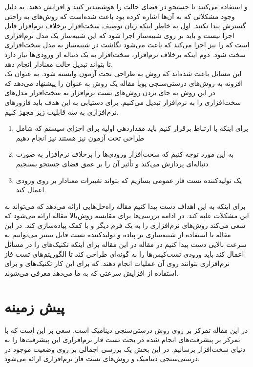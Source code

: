 \documentclass[conference]{IEEEtran}
\begin{document}
و
استفاده می‌کنند تا جستجو‌ در فضای حالت را هوشمند‌تر کنند و افزایش دهند.
به دلیل وجود مشکلاتی که 
به آن‌ها اشاره کرده بود \cite{b3}
باعث شده‌است که روش‌های
به راحتی گسترش پیدا نکنند.
اول به خاطر اینکه زبان توصیف سخت‌افزار برخلاف نرم‌افزار قابل اجرا نیست و باید بر روی شبیه‌ساز
اجرا شود که این شبیه‌ساز یک مدل نرم‌افزاری است که
را نیز اجرا می‌کند که باعث می‌شود نگاشت
در شبیه‌ساز به مدل سخت‌افزاری سخت شود.
دوم اینکه برخلاف نرم‌افزار، سخت‌افزار به یک دنباله از ورودی‌ها نیاز دارد تا بتواند تبدیل حالت
معنادار انجام دهد. \\
این مسائل باعث شده‌اند که روش
به طراحی تحت آزمون وابسته شود.
به عنوان یک افزونه به روش‌های درستی‌سنجی پویا مقاله
\cite{hf}
یک روش به عنوان
را پیشنهاد می‌دهد که در این روش به جای بردن روش‌های تست نرم‌افزار به سخت‌افزار
مدل‌های سخت‌افزاری را به نرم‌افزار تبدیل می‌کنیم.
برای دستیابی به این هدف باید فازور‌های نرم‌افزاری به سه قابلیت زیر مجهز کنیم.
\begin{enumerate}
    \item برای اینکه با
    ارتباط برقرار کنیم باید مقدار‌دهی اولیه برای اجزای سیستم که شامل طراحی تحت آزمون نیز هستند
    نیز انجام دهیم
    \item به این مورد توجه کنیم که سخت‌افزار ورودی‌ها را برخلاف نرم‌افزار به صورت دنباله‌ای
    پردازش می‌کند و تأثیر آن را بر عمق فضای جستجو بسنجیم
    \item یک تولید‌کننده تست فاز عمومی بسازیم که بتواند تغییرات معنادار بر روی ورودی اعمال کند.
\end{enumerate}
برای اینکه به این اهداف دست پیدا کنیم مقاله
\cite{hf}
راه‌حل‌هایی ارائه می‌دهد که می‌تواند به این مشکلات غلبه کند.
در ادامه بررسی‌ها برای مقایسه روش‌بالا مقاله
\cite{rf}
ارائه می‌شود که سعی می‌کند روش‌های نرم‌افزاری را به یک فرم دیگر و با کمک
پیاده‌سازی کند.
در این مقاله با استفاده از شبیه‌سازی بر پیاده
و تولید‌کننده تست قابل سنتز می‌توانیم به سرعت بالایی دست پیدا کنیم
در مقاله
\cite{rf}
در این مقاله برای اینکه تکنیک‌های
را در مسائل
اعمال کند باید ورودی تست‌کیس‌ها را به گونه‌ای طراحی کند تا الگوریتم‌های تست فاز نرم‌افزاری بتوانند
روی آن عملیات انجام دهند. که برای این کار تکنیک‌های
و
برای استفاده از افزایش سرعتی که
به ما می‌دهد معرفی می‌شوند.

\section{پیش زمینه}
در این مقاله تمرکز بر روی روش درستی‌سنجی دینامیک است.
سعی بر این است که با تمرکز بر پیشرفت‌های انجام شده در بحث تست فاز نرم‌افزاری این پیشرفت‌ها
را به دنیای سخت‌افزار برسانیم.
در این بخش یک بررسی اجمالی بر روی وضعیت موجود در درستی‌سنجی دینامیک و روش‌های تست
فاز نرم‌افزاری ارائه می‌شود.
\end{document}
